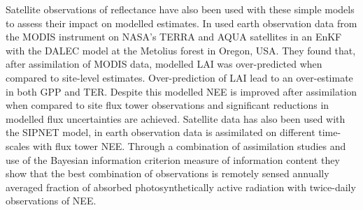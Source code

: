 \documentclass[12pt]{article}
\begin{document}
Satellite observations of reflectance have also been used with these simple models to assess their impact on modelled estimates. In \citet{Quaife2008} used earth observation data from the MODIS instrument on NASA's TERRA and AQUA satellites in an EnKF with the DALEC model at the Metolius forest in Oregon, USA. They found that, after assimilation of MODIS data, modelled LAI was over-predicted when compared to site-level estimates. Over-prediction of LAI lead to an over-estimate in both GPP and TER. Despite this modelled NEE is improved after assimilation when compared to site flux tower observations and significant reductions in modelled flux uncertainties are achieved. Satellite data has also been used with the SIPNET model, in \citet{zobitz2014joint} earth observation data is assimilated on different time-scales with flux tower NEE. Through a combination of assimilation studies and use of the Bayesian information criterion \citep{schwarz1978estimating} measure of information content they show that the best combination of observations is remotely sensed annually averaged fraction of absorbed photosynthetically active radiation with twice-daily observations of NEE.     
\end{document}
